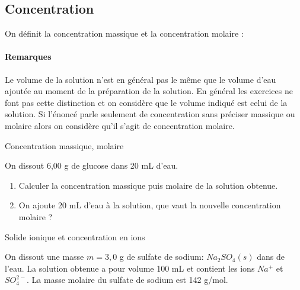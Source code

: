 \subsection{Concentration}
On définit la concentration massique et la concentration molaire : \\

\paragraph*{Remarques} Le volume de la solution n'est en général pas le même que le volume d'eau ajoutée au moment de la préparation de la solution. En général les exercices ne font pas cette distinction et on considère que le volume indiqué est celui de la solution. Si l'énoncé parle seulement de concentration sans préciser massique ou molaire alors on considère qu'il s'agit de concentration molaire.


 Concentration massique, molaire

On dissout 6,00 g de glucose dans 20 mL d'eau.

\begin{enumerate}
    \item Calculer la concentration massique puis molaire de la solution
    obtenue.
    \item On ajoute 20 mL d'eau à la solution, que vaut la nouvelle
    concentration molaire ?
\end{enumerate}

 Solide ionique et concentration en ions

On dissout une masse $m=3,0$ g de sulfate de sodium: $Na_2SO_4(s)$ dans de
l'eau. La solution obtenue a pour volume 100 mL et contient les ions
$Na^+$ et $SO_4^{2-}$. La masse molaire du sulfate de sodium est 142
g/mol.

